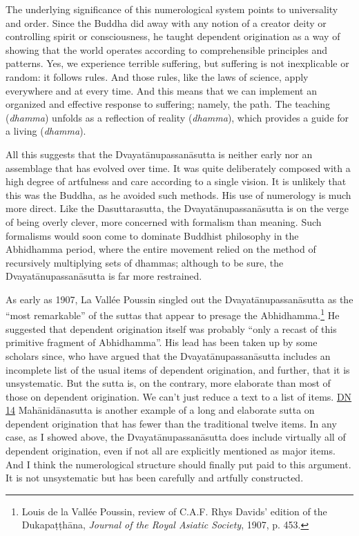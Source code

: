 \documentclass[12pt,openany]{book}%
\begin{document}
The underlying significance of this numerological system points to universality and order. Since the Buddha did away with any notion of a creator deity or controlling spirit or consciousness, he taught dependent origination as a way of showing that the world operates according to comprehensible principles and patterns. Yes, we experience terrible suffering, but suffering is not inexplicable or random: it follows rules. And those rules, like the laws of science, apply everywhere and at every time. And this means that we can implement an organized and effective response to suffering; namely, the path. The teaching (\textit{dhamma}) unfolds as a reflection of reality (\textit{dhamma}), which provides a guide for a living (\textit{dhamma}).

All this suggests that the \textsanskrit{Dvayatānupassanāsutta} is neither early nor an assemblage that has evolved over time. It was quite deliberately composed with a high degree of artfulness and care according to a single vision. It is unlikely that this was the Buddha, as he avoided such methods. His use of numerology is much more direct. Like the Dasuttarasutta, the \textsanskrit{Dvayatānupassanāsutta} is on the verge of being overly clever, more concerned with formalism than meaning. Such formalisms would soon come to dominate Buddhist philosophy in the Abhidhamma period, where the entire movement relied on the method of recursively multiplying sets of dhammas; although to be sure, the \textsanskrit{Dvayatānupassanāsutta} is far more restrained.

As early as 1907, La Vallée Poussin singled out the \textsanskrit{Dvayatānupassanāsutta} as the “most remarkable” of the suttas that appear to presage the Abhidhamma.\footnote{Louis de la Vallée Poussin, review of C.A.F. Rhys Davids’ edition of the \textsanskrit{Dukapaṭṭhāna}, \textit{Journal of the Royal Asiatic Society}, 1907, p. 453. } He suggested that dependent origination itself was probably “only a recast of this primitive fragment of Abhidhamma”. His lead has been taken up by some scholars since, who have argued that the \textsanskrit{Dvayatānupassanāsutta} includes an incomplete list of the usual items of dependent origination, and further, that it is unsystematic. But the sutta is, on the contrary, more elaborate than most of those on dependent origination. We can’t just reduce a text to a list of items. \href{https://suttacentral.net/dn14/en/sujato}{DN 14} \textsanskrit{Mahānidānasutta} is another example of a long and elaborate sutta on dependent origination that has fewer than the traditional twelve items. In any case, as I showed above, the \textsanskrit{Dvayatānupassanāsutta} does include virtually all of dependent origination, even if not all are explicitly mentioned as major items. And I think the numerological structure should finally put paid to this argument. It is not unsystematic but has been carefully and artfully constructed.
\end{document}
